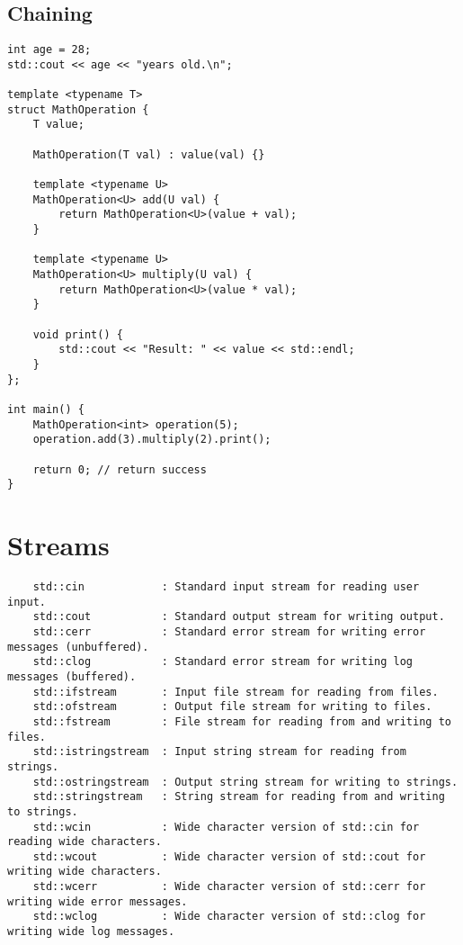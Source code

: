 \documentclass[openany]{report}
\begin{document}
\subsection{Chaining}

\begin{verbatim}
int age = 28;
std::cout << age << "years old.\n";

template <typename T>
struct MathOperation {
    T value;

    MathOperation(T val) : value(val) {}

    template <typename U>
    MathOperation<U> add(U val) {
        return MathOperation<U>(value + val);
    }

    template <typename U>
    MathOperation<U> multiply(U val) {
        return MathOperation<U>(value * val);
    }

    void print() {
        std::cout << "Result: " << value << std::endl;
    }
};

int main() {
    MathOperation<int> operation(5);
    operation.add(3).multiply(2).print();

    return 0; // return success
}
\end{verbatim}

\section{Streams}

\begin{verbatim}
    std::cin            : Standard input stream for reading user input.
    std::cout           : Standard output stream for writing output.
    std::cerr           : Standard error stream for writing error messages (unbuffered).
    std::clog           : Standard error stream for writing log messages (buffered).
    std::ifstream       : Input file stream for reading from files.
    std::ofstream       : Output file stream for writing to files.
    std::fstream        : File stream for reading from and writing to files.
    std::istringstream  : Input string stream for reading from strings.
    std::ostringstream  : Output string stream for writing to strings.
    std::stringstream   : String stream for reading from and writing to strings.
    std::wcin           : Wide character version of std::cin for reading wide characters.
    std::wcout          : Wide character version of std::cout for writing wide characters.
    std::wcerr          : Wide character version of std::cerr for writing wide error messages.
    std::wclog          : Wide character version of std::clog for writing wide log messages.
\end{verbatim}
\end{document}
